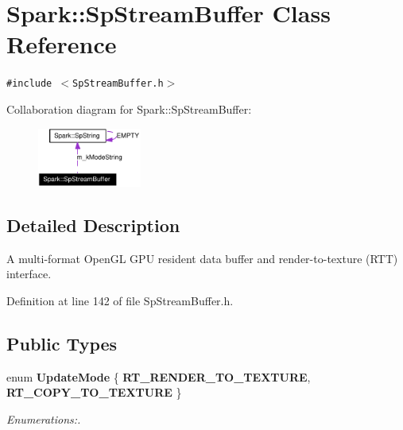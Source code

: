 \section{Spark::Sp\-Stream\-Buffer Class Reference}
\label{classSpark_1_1SpStreamBuffer}
{\tt \#include $<$Sp\-Stream\-Buffer.h$>$}

Collaboration diagram for Spark::Sp\-Stream\-Buffer:\begin{figure}[H]
\begin{center}
\leavevmode
\includegraphics[width=97pt]{classSpark_1_1SpStreamBuffer__coll__graph}
\end{center}
\end{figure}


\subsection{Detailed Description}
A multi-format Open\-GL GPU resident data buffer and render-to-texture (RTT) interface. 

Definition at line 142 of file Sp\-Stream\-Buffer.h.\subsection*{Public Types}
\begin{CompactItemize}
\item 
enum {\bf Update\-Mode} \{ {\bf RT\_\-RENDER\_\-TO\_\-TEXTURE}, 
{\bf RT\_\-COPY\_\-TO\_\-TEXTURE}
 \}
\begin{CompactList}\small\item\em Enumerations:. \item\end{CompactList}\end{CompactItemize}

